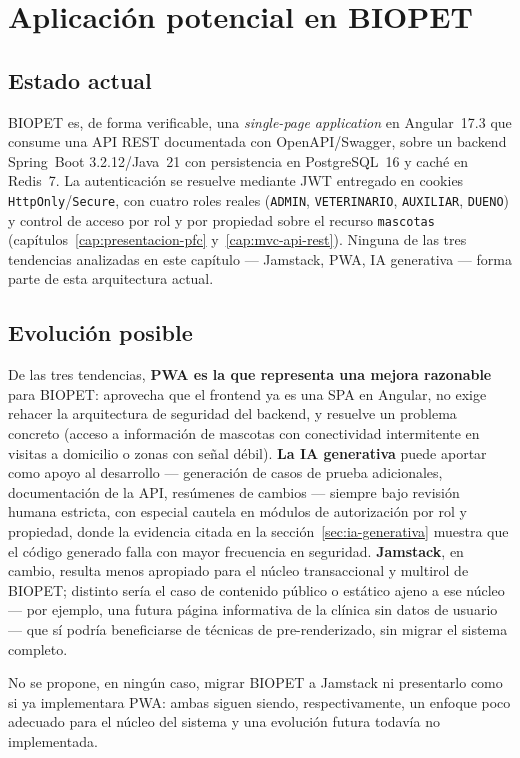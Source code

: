 \section{Aplicaci\'on potencial en BIOPET}
\label{sec:tendencias-biopet}

\subsection{Estado actual}
\label{sec:tendencias-biopet-actual}

BIOPET es, de forma verificable, una \emph{single-page application} en
Angular~17.3 que consume una API REST documentada con OpenAPI/Swagger, sobre
un backend Spring~Boot 3.2.12/Java~21 con persistencia en PostgreSQL~16 y
cach\'e en Redis~7. La autenticaci\'on se resuelve mediante JWT entregado en
cookies \texttt{HttpOnly}/\texttt{Secure}, con cuatro roles reales
(\texttt{ADMIN}, \texttt{VETERINARIO}, \texttt{AUXILIAR}, \texttt{DUENO}) y
control de acceso por rol y por propiedad sobre el recurso
\texttt{mascotas} (cap\'itulos~\ref{cap:presentacion-pfc}
y~\ref{cap:mvc-api-rest}). Ninguna de las tres tendencias analizadas en este
cap\'itulo --- Jamstack, PWA, IA generativa --- forma parte de esta
arquitectura actual.

\subsection{Evoluci\'on posible}
\label{sec:tendencias-biopet-futuro}

De las tres tendencias, \textbf{PWA es la que representa una mejora
razonable} para BIOPET: aprovecha que el frontend ya es una SPA en Angular,
no exige rehacer la arquitectura de seguridad del backend, y resuelve un
problema concreto (acceso a informaci\'on de mascotas con conectividad
intermitente en visitas a domicilio o zonas con se\~nal d\'ebil).
\textbf{La IA generativa} puede aportar como apoyo al desarrollo ---
generaci\'on de casos de prueba adicionales, documentaci\'on de la API,
res\'umenes de cambios --- siempre bajo revisi\'on humana estricta, con
especial cautela en m\'odulos de autorizaci\'on por rol y propiedad, donde la
evidencia citada en la secci\'on~\ref{sec:ia-generativa} muestra que el
c\'odigo generado falla con mayor frecuencia en seguridad. \textbf{Jamstack},
en cambio, resulta menos apropiado para el n\'ucleo transaccional y
multirol de BIOPET; distinto ser\'ia el caso de contenido p\'ublico o
est\'atico ajeno a ese n\'ucleo --- por ejemplo, una futura p\'agina
informativa de la cl\'inica sin datos de usuario --- que s\'i podr\'ia
beneficiarse de t\'ecnicas de pre-renderizado, sin migrar el sistema
completo.

No se propone, en ning\'un caso, migrar BIOPET a Jamstack ni presentarlo
como si ya implementara PWA: ambas siguen siendo, respectivamente, un
enfoque poco adecuado para el n\'ucleo del sistema y una evoluci\'on futura
todav\'ia no implementada.
